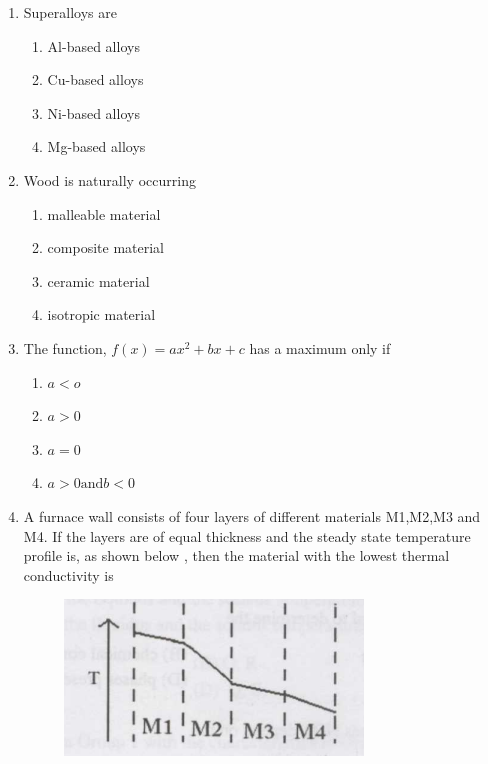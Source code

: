 \documentclass[journal]{IEEEtran}
\theoremstyle{remark}
\begin{document}
\begin{enumerate}
\item Superalloys are \hfill{}
\begin{multicols}{2}
\begin{enumerate}
\item Al-based alloys
\item Cu-based alloys
\item Ni-based alloys
\item Mg-based alloys
\end{enumerate}
\end{multicols}

\item Wood is naturally occurring 
\hfill{}
\begin{multicols}{2}
\begin{enumerate}
\item malleable material
\item composite material
\item ceramic material
\item isotropic material    
\end{enumerate}
\end{multicols}
\item The function, $f(x)=ax^2+bx+c$ has a maximum only if \hfill{}
\begin{multicols}{4}
\begin{enumerate}
        \item$a<o$
        \item $a>0$
        \item $a=0$
        \item $a>0\text{and}b<0$
\end{enumerate}
\end{multicols}
\item A furnace wall consists of four layers of different materials M1,M2,M3 and M4. If the layers are of equal thickness and the steady state temperature profile is, as shown below , then the material with the lowest thermal conductivity is\hfill{}
\begin{figure}[h]
    \centering
    \includegraphics[width=0.5\linewidth]{IMAGES/Q.12.png}

\end{figure}
\end{enumerate}
\end{document}
